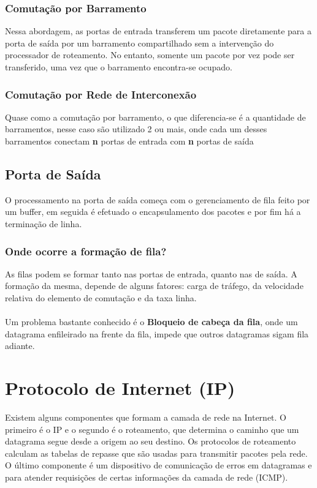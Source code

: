 \documentclass[a4paper, 12pt]{article}
\begin{document}
        \subsubsection{Comutação por Barramento}
        Nessa abordagem, as portas de entrada transferem um pacote diretamente para a porta de saída por um barramento compartilhado sem a intervenção
        do processador de roteamento. No entanto, somente um pacote por vez pode ser transferido, uma vez que o barramento encontra-se ocupado.

        \subsubsection{Comutação por Rede de Interconexão}
        Quase como a comutação por barramento, o que diferencia-se é a quantidade de barramentos, nesse caso são utilizado 2 ou mais, onde cada um 
        desses barramentos conectam \textbf{n} portas de entrada com \textbf{n} portas de saída

\subsection{Porta de Saída}
O processamento na porta de saída começa com o gerenciamento de fila feito por um buffer, em seguida é efetuado o encapsulamento dos pacotes e por 
fim há a terminação de linha.

    \subsubsection{Onde ocorre a formação de fila?}
    As filas podem se formar tanto nas portas de entrada, quanto nas de saída. A formação 
    da mesma, depende de alguns fatores: carga de tráfego, da velocidade relativa do 
    elemento de comutação e da taxa linha.
\\
\\
Um problema bastante conhecido é o \textbf{Bloqueio de cabeça da fila}, onde um datagrama enfileirado na frente da fila, impede
que outros datagramas sigam fila adiante.

\newpage

\section{Protocolo de Internet (IP)}
Existem alguns componentes que formam a camada de rede na Internet. O primeiro é o IP e o
segundo é o roteamento, que determina o caminho que um datagrama segue desde a origem ao
seu destino. Os protocolos de roteamento calculam as tabelas de repasse que são usadas
para transmitir pacotes pela rede. O último componente é um dispositivo de comunicação
de erros em datagramas e para atender requisições de certas informações da camada de 
rede (ICMP). 
\end{document}

